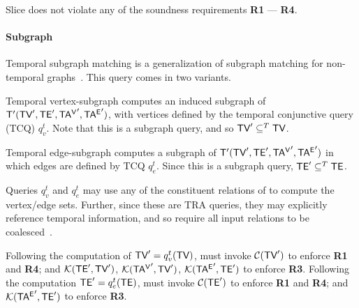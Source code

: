 
Slice does not violate any of the soundness requirements {\bf R1} ---
{\bf R4}. 

\paragraph*{Subgraph}  Temporal subgraph matching is a generalization of
subgraph matching for non-temporal graphs~\cite{Wood2012}.  This query
comes in two variants.


Temporal vertex-subgraph  computes an induced
subgraph of \tve $\mathsf{T}'(\textsf{TV}', \textsf{TE}', \mathsf{TA^{V}}', \mathsf{TA^{E}}')$, with vertices
defined by the temporal conjunctive query (TCQ) $q^t_v$.  Note that
this is a subgraph query, and so $\textsf{TV}' \subseteq^T \textsf{TV}$.


Temporal edge-subgraph  computes a subgraph of \ttt
$\mathsf{T}'(\textsf{TV}', \textsf{TE}', \mathsf{TA^{V}}', \mathsf{TA^{E}}')$ in which edges are defined by TCQ
$q^t_e$.  Since this is a subgraph query, $\textsf{TE}' \subseteq^T \textsf{TE}$.

Queries $q^t_v$ and $q^t_e$ may use any of the constituent relations
of \tve to compute the vertex/edge sets.  Further, since these
are TRA queries, they may explicitly reference temporal information,
and so require all input relations to be
coalesced~\cite{DBLP:reference/db/Bohlen09}.

Following the computation of $\textsf{TV}' = q^t_v(\textsf{TV})$, 
must invoke $\mathcal{C}(\textsf{TV}')$ to enforce {\bf R1} and {\bf R4}; and
$\mathcal{K}(\textsf{TE}',\textsf{TV}')$, $\mathcal{K}(\mathsf{TA^{V}}',\textsf{TV}')$, $\mathcal{K}(\mathsf{TA^{E}}',\textsf{TE}')$
to enforce {\bf R3}.
%
Following the computation $\textsf{TE}' = q^t_e(\textsf{TE})$,  must
invoke $\mathcal{C}(\textsf{TE}')$ to enforce {\bf R1} and {\bf R4}; and
$\mathcal{K}(\mathsf{TA^{E}}',\textsf{TE}')$ to enforce {\bf R3}.  %


